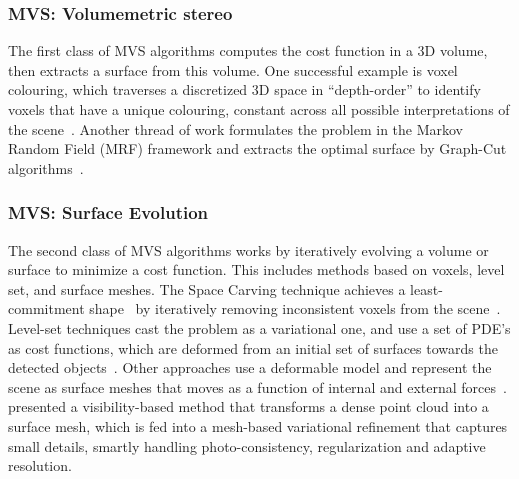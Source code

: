 \subsubsection{MVS: Volumemetric stereo}
The first class of MVS algorithms computes the cost function in a 3D volume, then extracts a surface from this volume. One successful example is voxel colouring, which traverses a discretized 3D space in “depth-order” to identify voxels that have a unique colouring, constant across all possible interpretations of the scene~\cite{seitz1997photorealistic}. Another thread of work formulates the problem in the Markov Random Field (MRF) framework and extracts the optimal surface by Graph-Cut algorithms~\cite{roy1998maximum,vogiatzis2005multi,vogiatzis2007multiview}.

\subsubsection{MVS: Surface Evolution}
The second class of MVS algorithms works by iteratively evolving a volume or surface to minimize a cost function. This includes methods based on voxels, level set, and surface meshes. The Space Carving technique achieves a least-commitment shape~\cite{marr1982vision} by iteratively removing inconsistent voxels from the scene~\cite{kutulakos2000theory}. Level-set techniques cast the problem as a variational one, and use a set of PDE's as cost functions, which are deformed from an initial set of surfaces towards the detected objects~\cite{faugeras2002variational}. Other approaches use a deformable model and represent the scene as surface meshes that moves as a function of internal and external forces~\cite{esteban2004silhouette}. \citeauthor{hiep2009towards} presented a visibility-based method that transforms a dense point cloud into a surface mesh, which is fed into a mesh-based variational refinement that captures small details, smartly handling photo-consistency, regularization and adaptive resolution.


